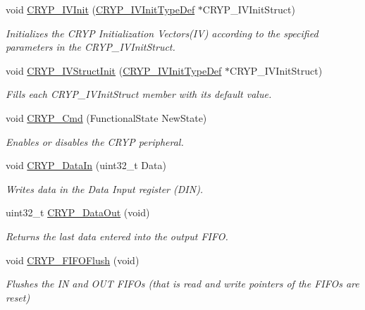 \begin{DoxyCompactItemize}
void \hyperlink{group___c_r_y_p_ga133964b50a07db3a32864308f6355a8b}{C\-R\-Y\-P\-\_\-\-I\-V\-Init} (\hyperlink{struct_c_r_y_p___i_v_init_type_def}{C\-R\-Y\-P\-\_\-\-I\-V\-Init\-Type\-Def} $\ast$C\-R\-Y\-P\-\_\-\-I\-V\-Init\-Struct)
\begin{DoxyCompactList}\small\item\em Initializes the C\-R\-Y\-P Initialization Vectors(\-I\-V) according to the specified parameters in the C\-R\-Y\-P\-\_\-\-I\-V\-Init\-Struct. \end{DoxyCompactList}\item 
void \hyperlink{group___c_r_y_p_ga58899074e08bbd65f2ed304cf0f42987}{C\-R\-Y\-P\-\_\-\-I\-V\-Struct\-Init} (\hyperlink{struct_c_r_y_p___i_v_init_type_def}{C\-R\-Y\-P\-\_\-\-I\-V\-Init\-Type\-Def} $\ast$C\-R\-Y\-P\-\_\-\-I\-V\-Init\-Struct)
\begin{DoxyCompactList}\small\item\em Fills each C\-R\-Y\-P\-\_\-\-I\-V\-Init\-Struct member with its default value. \end{DoxyCompactList}\item 
void \hyperlink{group___c_r_y_p_gad39ccd9b1f2e088e3a227d7a1c410d7c}{C\-R\-Y\-P\-\_\-\-Cmd} (Functional\-State New\-State)
\begin{DoxyCompactList}\small\item\em Enables or disables the C\-R\-Y\-P peripheral. \end{DoxyCompactList}\item 
void \hyperlink{group___c_r_y_p_ga16dc76244318d464357ee6ff208bf9a4}{C\-R\-Y\-P\-\_\-\-Data\-In} (uint32\-\_\-t Data)
\begin{DoxyCompactList}\small\item\em Writes data in the Data Input register (D\-I\-N). \end{DoxyCompactList}\item 
uint32\-\_\-t \hyperlink{group___c_r_y_p_gacbe5fcf4c7e4919192376fa615588b54}{C\-R\-Y\-P\-\_\-\-Data\-Out} (void)
\begin{DoxyCompactList}\small\item\em Returns the last data entered into the output F\-I\-F\-O. \end{DoxyCompactList}\item 
void \hyperlink{group___c_r_y_p_ga23ada9d9464e1362299d7612a1409a57}{C\-R\-Y\-P\-\_\-\-F\-I\-F\-O\-Flush} (void)
\begin{DoxyCompactList}\small\item\em Flushes the I\-N and O\-U\-T F\-I\-F\-Os (that is read and write pointers of the F\-I\-F\-Os are reset) \end{DoxyCompactList}\item 

\end{DoxyCompactItemize}
